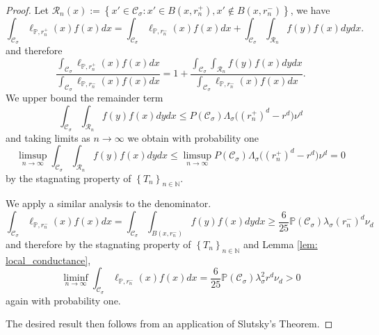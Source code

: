 \documentclass{article}
\newcommand{\set}[1]{\left\{#1\right\}}
\newcommand{\seq}[1]{\set{#1}_{n \in \N}}
\newcommand{\N}{\mathbb{N}}
\newcommand{\Cset}{\mathcal{C}}
\newcommand{\Csig}{\Cset_{\sigma}}
\newcommand{\Pbb}{\mathbb{P}}
\newcommand{\1}{\mathbf{1}}
\theoremstyle{alden}
\theoremstyle{aldenthm}
\theoremstyle{remark}
\begin{document}
\begin{proof}
	Let $\mathcal{R}_n(x) := \set{x' \in \Csig: x' \in B(x,r_n^+), x' \not\in B(x,r_n^-)}$, we have
	\begin{equation*}
	\int_{\Csig} \ell_{\Pbb,r_n^+}(x) f(x) dx = \int_{\Csig} \ell_{\Pbb,r_n^-}(x) f(x) dx + \int_{\Csig} \int_{\mathcal{R}_n} f(y) f(x) dy dx.
	\end{equation*}
	and therefore
	\begin{equation*}
	\frac{\int_{\Csig} \ell_{\Pbb,r_n^+}(x) f(x) dx}{\int_{\Csig} \ell_{\Pbb,r_n^-}(x) f(x) dx} = 1 + \frac{\int_{\Csig} \int_{\mathcal{R}_n} f(y) f(x) dy dx}{\int_{\Csig} \ell_{\Pbb,r_n^-}(x) f(x) dx}. 
	\end{equation*}
	We upper bound the remainder term
	\begin{equation*}
	\int_{\Csig} \int_{\mathcal{R}_n} f(y) f(x) dy dx \leq P(\Csig) \Lambda_{\sigma} \bigl((r_n^+)^d - r^d)\nu^d
	\end{equation*}
	and taking limits as $n \to \infty$ we obtain with probability one
	\begin{equation*}
	\limsup_{n \to \infty} \int_{\Csig} \int_{\mathcal{R}_n} f(y) f(x) dy dx \leq \limsup_{n \to \infty} P(\Csig) \Lambda_{\sigma} \bigl((r_n^+)^d - r^d)\nu^d = 0
	\end{equation*}
	by the stagnating property of $\seq{T_n}$. 
	
	We apply a similar analysis to the denominator.
	\begin{equation*}
	\int_{\Csig} \ell_{\Pbb,r_n^-}(x) f(x) dx = \int_{\Csig} \int_{B(x,r_n^-)} f(y) f(x) dy dx \geq \frac{6}{25} \Pbb(\Csig) \lambda_{\sigma} (r_n^{-})^d \nu_d
	\end{equation*}
	and therefore by the stagnating property of $\seq{T_n}$ and Lemma \ref{lem: local_conductance},
	\begin{equation*}
	\liminf_{n \to \infty} \int_{\Csig} \ell_{\Pbb,r_n^-}(x) f(x) dx  = \frac{6}{25} \Pbb(\Csig) \lambda_{\sigma}^2 r^d \nu_d > 0
	\end{equation*}
	again with probability one.
	
	The desired result then follows from an application of Slutsky's Theorem.
\end{proof}
\end{document}
